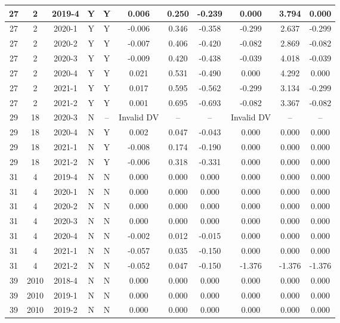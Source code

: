 \begin{landscape}
\begin{longtable}{@{}ccccc|ccc|ccc@{}}
27 & 2 & 2019-4 & Y & Y & 0.006 & 0.250 & -0.239 & 0.000 & 3.794 & 0.000 \\* \midrule
27 & 2 & 2020-1 & Y & Y & -0.006 & 0.346 & -0.358 & -0.299 & 2.637 & -0.299 \\* \midrule
27 & 2 & 2020-2 & Y & Y & -0.007 & 0.406 & -0.420 & -0.082 & 2.869 & -0.082 \\* \midrule
27 & 2 & 2020-3 & Y & Y & -0.009 & 0.420 & -0.438 & -0.039 & 4.018 & -0.039 \\* \midrule
27 & 2 & 2020-4 & Y & Y & 0.021 & 0.531 & -0.490 & 0.000 & 4.292 & 0.000 \\* \midrule
27 & 2 & 2021-1 & Y & Y & 0.017 & 0.595 & -0.562 & -0.299 & 3.134 & -0.299 \\* \midrule
27 & 2 & 2021-2 & Y & Y & 0.001 & 0.695 & -0.693 & -0.082 & 3.367 & -0.082 \\* \midrule
29 & 18 & 2020-3 & N & -- & Invalid DV & -- & -- & Invalid DV & -- & -- \\* \midrule
29 & 18 & 2020-4 & N & Y & 0.002 & 0.047 & -0.043 & 0.000 & 0.000 & 0.000 \\* \midrule
29 & 18 & 2021-1 & N & Y & -0.008 & 0.174 & -0.190 & 0.000 & 0.000 & 0.000 \\* \midrule
29 & 18 & 2021-2 & N & Y & -0.006 & 0.318 & -0.331 & 0.000 & 0.000 & 0.000 \\* \midrule
31 & 4 & 2019-4 & N & N & 0.000 & 0.000 & 0.000 & 0.000 & 0.000 & 0.000 \\* \midrule
31 & 4 & 2020-1 & N & N & 0.000 & 0.000 & 0.000 & 0.000 & 0.000 & 0.000 \\* \midrule
31 & 4 & 2020-2 & N & N & 0.000 & 0.000 & 0.000 & 0.000 & 0.000 & 0.000 \\* \midrule
31 & 4 & 2020-3 & N & N & 0.000 & 0.000 & 0.000 & 0.000 & 0.000 & 0.000 \\* \midrule
31 & 4 & 2020-4 & N & N & -0.002 & 0.012 & -0.015 & 0.000 & 0.000 & 0.000 \\* \midrule
31 & 4 & 2021-1 & N & N & -0.057 & 0.035 & -0.150 & 0.000 & 0.000 & 0.000 \\* \midrule
31 & 4 & 2021-2 & N & N & -0.052 & 0.047 & -0.150 & -1.376 & -1.376 & -1.376 \\* \midrule
39 & 2010 & 2018-4 & N & N & 0.000 & 0.000 & 0.000 & 0.000 & 0.000 & 0.000 \\* \midrule
39 & 2010 & 2019-1 & N & N & 0.000 & 0.000 & 0.000 & 0.000 & 0.000 & 0.000 \\* \midrule
39 & 2010 & 2019-2 & N & N & 0.000 & 0.000 & 0.000 & 0.000 & 0.000 & 0.000 \\* \midrule

\end{longtable}
\end{landscape}
